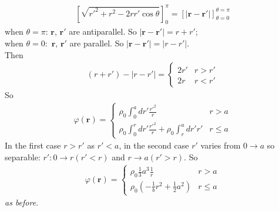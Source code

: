\documentclass[a4paper]{article}
\begin{document}
\begin{eg}
\begin{equation*}
\begin{aligned}
\left[\sqrt{r'^2+r^2-2rr'\cos\theta}\right]_0^\pi = \left[|\mathbf{r}-\mathbf{r'}|\right]_{\theta=0}^{\theta=\pi}
\end{aligned}
\end{equation*}
when $\theta =\pi$: $\mathbf{r}$, $\mathbf{r'}$ are antiparallel. So $|\mathbf{r}-\mathbf{r}'| = r+r'$;\\
when $\theta = 0:$ $\mathbf{r}$, $\mathbf{r'}$ are parallel. So $|\mathbf{r}-\mathbf{r'}| = |r-r'|$.\\
Then
\begin{equation*}
\begin{aligned}
\left(r+r'\right) - |r-r'| = \left\{
\begin{array}{ll}
2r' & r>r'\\
2r & r<r'
\end{array}
\right.
\end{aligned}
\end{equation*}
So
\begin{equation*}
\begin{aligned}
\varphi\left(\mathbf{r}\right) = \left\{
\begin{array}{ll}
\rho_0 \int_0^a dr' \frac{r'^2}{r} & r>a\\
\rho_0 \int_0^r dr' \frac{r'^2}{r} + \rho_0\int_r^a dr' r' & r\leq a
\end{array}
\right.
\end{aligned}
\end{equation*}
In the first case $r>r'$ as $r'<a$, in the second case $r'$ varies from $0\to a$ so separable: $r':0\to r(r'<r)$ and $r\to a(r'>r)$. So
\begin{equation*}
\begin{aligned}
\varphi\left(\mathbf{r}\right) = \left\{
\begin{array}{ll}
\rho_0 \frac{1}{3}a^3 \frac{1}{r} & r>a\\
\rho_0 \left(-\frac{1}{b}r^2 + \frac{1}{2}a^2\right) & r\leq a
\end{array}
\right.
\end{aligned}
\end{equation*}
\emph{as before}.


\end{eg}
\end{document}
